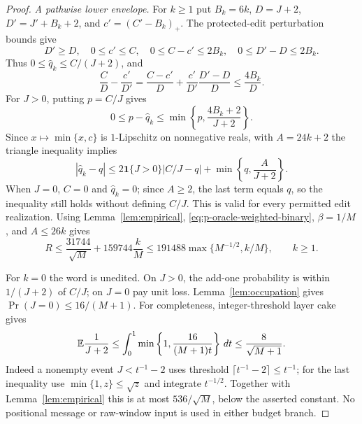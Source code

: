 \begin{proof}
\emph{A pathwise lower envelope.}
For $k\ge1$ put $B_k=6k$, $D=J+2$, $D'=J'+B_k+2$, and
$c'=(C'-B_k)_+$.  The protected-edit perturbation bounds give
\[
 D'\ge D,\quad0\le c'\le C,\quad
 0\le C-c'\le2B_k,\quad0\le D'-D\le2B_k.
\]
Thus $0\le\widehat q_k\le C/(J+2)$, and
\[
 \frac CD-\frac{c'}{D'}
 =\frac{C-c'}D+\frac{c'}{D'}\frac{D'-D}D
 \le\frac{4B_k}D.
\]
For $J>0$, putting $p=C/J$ gives
\[
 0\le p-\widehat q_k
 \le\min\left\{p,\frac{4B_k+2}{J+2}\right\}.
\]
Since $x\mapsto\min\{x,c\}$ is $1$-Lipschitz on nonnegative reals,
with $A=24k+2$ the triangle inequality implies
\begin{equation}\label{eq:p-oracle-pathwise}
 |\widehat q_k-q|
 \le2\mathbf1\{J>0\}|C/J-q|
       +\min\left\{q,\frac A{J+2}\right\}.
\end{equation}
When $J=0$, $C=0$ and $\widehat q_k=0$; since $A\ge2$, the last
term equals $q$, so the inequality still holds without defining $C/J$.
This is valid for every permitted edit realization.
Using Lemma~\ref{lem:empirical},
\eqref{eq:p-oracle-weighted-binary}, $\beta=1/M$, and $A\le26k$ gives
\[
 R\le\frac{31744}{\sqrt M}+159744\frac kM
 \le191488\max\{M^{-1/2},k/M\},\qquad k\ge1.
\]

For $k=0$ the word is unedited.  On $J>0$, the add-one probability
is within $1/(J+2)$ of $C/J$; on $J=0$ pay unit loss.
Lemma~\ref{lem:occupation} gives $\Pr(J=0)\le16/(M+1)$.
For completeness, integer-threshold layer cake gives
\[
 \mathbb E\frac1{J+2}
 \le\int_0^1\min\left\{1,\frac{16}{(M+1)t}\right\}\,dt
 \le\frac8{\sqrt{M+1}}.
\]
Indeed a nonempty event $J<t^{-1}-2$ uses threshold
$\lceil t^{-1}-2\rceil\le t^{-1}$; for the last inequality use
$\min\{1,z\}\le\sqrt z$ and integrate $t^{-1/2}$.
Together with Lemma~\ref{lem:empirical} this is at most
$536/\sqrt M$, below the asserted constant.  No positional message or
raw-window input is used in either budget branch.
\end{proof}
